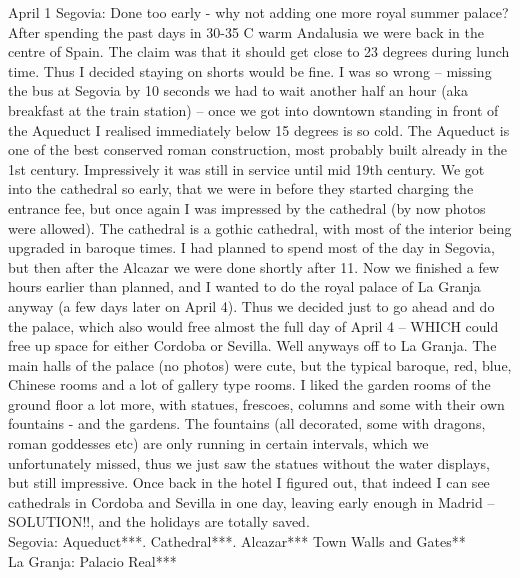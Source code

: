 April 1 
Segovia: Done too early - why not adding one more royal summer palace?\\
After spending the past days in 30-35 C warm Andalusia we were back in the centre of Spain. The claim was that it should get close to 23 degrees during lunch time. Thus I decided staying on shorts would be fine. I was so wrong -- missing the bus at Segovia by 10 seconds we had to wait another half an hour (aka breakfast at the train station) -- once we got into downtown standing in front of the Aqueduct I realised immediately below 15 degrees is so cold. The Aqueduct is one of the best conserved roman construction, most probably built already in the 1st century. Impressively it was still in service until mid 19th century. We got into the cathedral so early, that we were in before they started charging the entrance fee, but once again I was impressed by the cathedral (by now photos were allowed). The cathedral is a gothic cathedral, with most of the interior being upgraded in baroque times. I had planned to spend most of the day in Segovia, but then after the Alcazar we were done shortly after 11.  Now we finished a few hours earlier than planned, and I wanted to do the royal palace of La Granja anyway (a few days later on April 4). Thus we decided just to go ahead and do the palace, which also would free almost the full day of April 4 -- WHICH could free up space for either Cordoba or Sevilla. Well anyways off to La Granja. The main halls of the palace (no photos) were cute, but the typical baroque, red, blue, Chinese rooms and a lot of gallery type rooms. I liked the garden rooms of the ground floor a lot more, with statues, frescoes, columns and some with their own fountains - and the gardens. The fountains (all decorated, some with dragons, roman goddesses etc) are only running in certain intervals, which we unfortunately missed, thus we just saw the statues without the water displays, but still impressive. Once back in the hotel I figured out, that indeed I can see cathedrals in Cordoba and Sevilla in one day, leaving early enough in Madrid -- SOLUTION!!, and the holidays are totally saved. \\

Segovia: Aqueduct***.
Cathedral***.
Alcazar***
Town Walls and Gates**\\
La Granja: 
Palacio Real***\\

